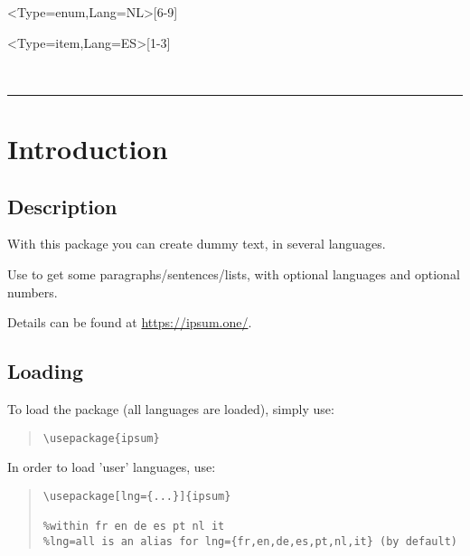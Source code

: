 \documentclass[11pt,a4paper]{ltxdoc}
\begin{document}
\begin{tcolorbox}[colframe=lightgray,colback=lightgray!5]
\ipsum<Type=enum,Lang=NL>[6-9]
\end{tcolorbox}

\begin{tcolorbox}[colframe=lightgray,colback=lightgray!5]
\ipsum<Type=item,Lang=ES>[1-3]
\end{tcolorbox}

\vfill~

\pagebreak


\hypertarget{matoc}{}

\tableofcontents

\vspace*{5mm}

\hrule

\vspace*{5mm}

\section{Introduction}

\subsection{Description}

With this package you can create dummy text, in several languages.

Use \cmd{\ipsum} to get some paragraphs/sentences/lists, with optional languages and optional numbers.

Details can be found at \url{https://ipsum.one/}.

\subsection{Loading}

To load the package (all languages are loaded), simply use:

\begin{quote}
\begin{verbatim}
\usepackage{ipsum}
\end{verbatim}
\end{quote}

In order to load 'user' languages, use:

\begin{quote}
\begin{verbatim}
\usepackage[lng={...}]{ipsum}

%within fr en de es pt nl it
%lng=all is an alias for lng={fr,en,de,es,pt,nl,it} (by default)
\end{verbatim}
\end{quote}
\end{document}
